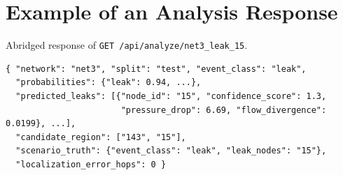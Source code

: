 \documentclass[11pt,letterpaper]{report}
\theoremstyle{definition}
\theoremstyle{plain}
\theoremstyle{remark}
\begin{document}
\chapter{Example of an Analysis Response}
Abridged response of \texttt{GET /api/analyze/net3\_leak\_15}.
\begin{lstlisting}
{ "network": "net3", "split": "test", "event_class": "leak",
  "probabilities": {"leak": 0.94, ...},
  "predicted_leaks": [{"node_id": "15", "confidence_score": 1.3,
                       "pressure_drop": 6.69, "flow_divergence": 0.0199}, ...],
  "candidate_region": ["143", "15"],
  "scenario_truth": {"event_class": "leak", "leak_nodes": "15"},
  "localization_error_hops": 0 }
\end{lstlisting}
\end{document}
